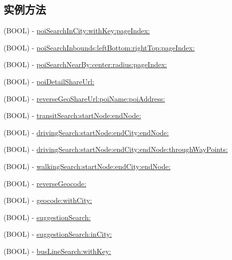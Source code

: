 \subsection*{实例方法}
\begin{DoxyCompactItemize}
\item 
(B\-O\-O\-L) -\/ \hyperlink{interface_b_m_k_search_a3d4be019a638b79bff6c95081e624b24}{poi\-Search\-In\-City\-:with\-Key\-:page\-Index\-:}
\item 
(B\-O\-O\-L) -\/ \hyperlink{interface_b_m_k_search_a905ca1d5f5b829d9759903234b359657}{poi\-Search\-Inbounds\-:left\-Bottom\-:right\-Top\-:page\-Index\-:}
\item 
(B\-O\-O\-L) -\/ \hyperlink{interface_b_m_k_search_ad57823f0c67cfa45180b69299b546351}{poi\-Search\-Near\-By\-:center\-:radius\-:page\-Index\-:}
\item 
(B\-O\-O\-L) -\/ \hyperlink{interface_b_m_k_search_aa8d9cd82853ef5c350fdb1f401e7b061}{poi\-Detail\-Share\-Url\-:}
\item 
(B\-O\-O\-L) -\/ \hyperlink{interface_b_m_k_search_af6465436fb7bd5f89382ce29ae2ae6b4}{reverse\-Geo\-Share\-Url\-:poi\-Name\-:poi\-Address\-:}
\item 
(B\-O\-O\-L) -\/ \hyperlink{interface_b_m_k_search_a2c2eacd43a31175dfcc1d4c6d89e0498}{transit\-Search\-:start\-Node\-:end\-Node\-:}
\item 
(B\-O\-O\-L) -\/ \hyperlink{interface_b_m_k_search_a20e8105eea18c931b4f7d5f75cefbf09}{driving\-Search\-:start\-Node\-:end\-City\-:end\-Node\-:}
\item 
(B\-O\-O\-L) -\/ \hyperlink{interface_b_m_k_search_acc6e736e62cdafd5a1daa94d75071642}{driving\-Search\-:start\-Node\-:end\-City\-:end\-Node\-:through\-Way\-Points\-:}
\item 
(B\-O\-O\-L) -\/ \hyperlink{interface_b_m_k_search_aa2a9b0f69520e4e17ff9504d10e77f57}{walking\-Search\-:start\-Node\-:end\-City\-:end\-Node\-:}
\item 
(B\-O\-O\-L) -\/ \hyperlink{interface_b_m_k_search_ae5169b6362dda612ffd1f1b5f9df6137}{reverse\-Geocode\-:}
\item 
(B\-O\-O\-L) -\/ \hyperlink{interface_b_m_k_search_a5bd9e45d6d8042585428d5bdde0b584b}{geocode\-:with\-City\-:}
\item 
(B\-O\-O\-L) -\/ \hyperlink{interface_b_m_k_search_a8d4b04f2d17b67229b59bf6224bdee7a}{suggestion\-Search\-:}
\item 
(B\-O\-O\-L) -\/ \hyperlink{interface_b_m_k_search_a4d0b7ec9e07dd5493e14de39edf852d0}{suggestion\-Search\-:in\-City\-:}
\item 
(B\-O\-O\-L) -\/ \hyperlink{interface_b_m_k_search_ac6256527dd532f554d02410cef13caf8}{bus\-Line\-Search\-:with\-Key\-:}
\end{DoxyCompactItemize}

